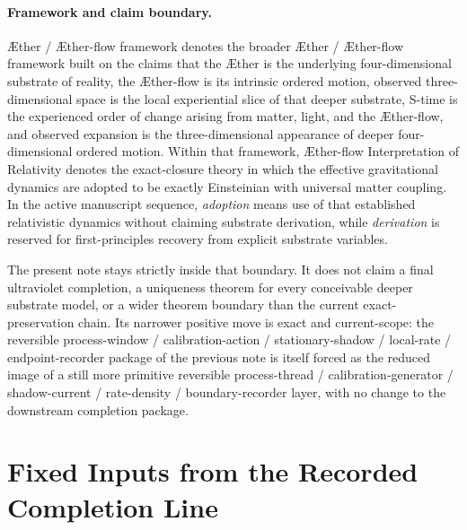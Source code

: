 \documentclass[11pt]{article}
\newcommand{\Aether}{\AE{}ther}
\newcommand{\Aflow}{\AE{}ther-flow}
\newcommand{\TheoryName}{\Aflow{} Interpretation of Relativity}
\newcommand{\TheoryProgram}{\Aether{} / \Aflow{} framework}
\begin{document}
\paragraph{Framework and claim boundary.}
\TheoryProgram{} denotes the broader \Aether{} / \Aflow{} framework built on the claims that the \Aether{} is the underlying four-dimensional substrate of reality, the \Aflow{} is its intrinsic ordered motion, observed three-dimensional space is the local experiential slice of that deeper substrate, S-time is the experienced order of change arising from matter, light, and the \Aflow{}, and observed expansion is the three-dimensional appearance of deeper four-dimensional ordered motion. Within that framework, \TheoryName{} denotes the exact-closure theory in which the effective gravitational dynamics are adopted to be exactly Einsteinian with universal matter coupling. In the active manuscript sequence, \emph{adoption} means use of that established relativistic dynamics without claiming substrate derivation, while \emph{derivation} is reserved for first-principles recovery from explicit substrate variables.

The present note stays strictly inside that boundary. It does not claim a final ultraviolet completion, a uniqueness theorem for every conceivable deeper substrate model, or a wider theorem boundary than the current exact-preservation chain. Its narrower positive move is exact and current-scope: the reversible process-window / calibration-action / stationary-shadow / local-rate / endpoint-recorder package of the previous note is itself forced as the reduced image of a still more primitive reversible process-thread / calibration-generator / shadow-current / rate-density / boundary-recorder layer, with no change to the downstream completion package.

\section{Fixed Inputs from the Recorded Completion Line}
\end{document}
